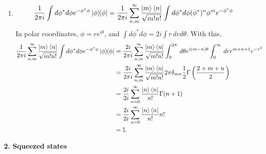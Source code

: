 \documentclass{article}
\theoremstyle{definition}
\newcommand{\f}[2]{\frac{#1}{#2}}
\newcommand{\lp}{\left(}
\newcommand{\rp}{\right)}
\begin{document}
\begin{enumerate}[label=(\alph*)]
	\item 
	\begin{align*}
	\f{1}{2\pi i}\int d\phi^* d\phi e^{-\phi^*\phi}\ketbra{\phi} = 
	\f{1}{2\pi i} \sum^\infty_{n,m} \f{\ket{m}\bra{n}}{\sqrt{m!n!}} 
	\int d\phi^* d\phi  (\phi^*)^n \phi^m e^{-\phi^*\phi}
	\end{align*}
	In polar coordinates, $\phi =re^{i\theta}$, and $\int d\phi^* d\phi = 2i\int r\,drd\theta$. With this, 
	\begin{align*}
	\f{1}{2\pi i}\sum^\infty_{n,m} \f{\ket{m}\bra{n}}{\sqrt{m!n!}} \int d\phi^* d\phi e^{-\phi^*\phi}\ketbra{\phi} 
	&= \f{2i}{2\pi i}\sum^\infty_{n,m} \f{\ket{m}\bra{n}}{\sqrt{m!n!}} \int^{2\pi}_0 \,d\theta e^{i(m-n)\theta} \int_0^\infty \,dr r^{m+n+1} e^{-r^2}\\
	&= \f{2i}{2\pi i}\sum^\infty_{n,m} \f{\ket{m}\bra{n}}{\sqrt{m!n!}} 2\pi \delta_{mn} \f{1}{2}\Gamma\lp  \f{2+m+n}{2}\rp\\
	&= \f{2i}{2i} \sum^\infty_{n=0} \f{\ket{n}\bra{n}}{n!} \Gamma(n+1)\\
	&= \f{2i}{2i} \sum^\infty_{n=0} \f{\ket{n}\bra{n}}{n!} n!\\
	&= \mathbb{I}.
	\end{align*}
\end{enumerate}



\noindent \textbf{2. Squeezed states}
\end{document}
